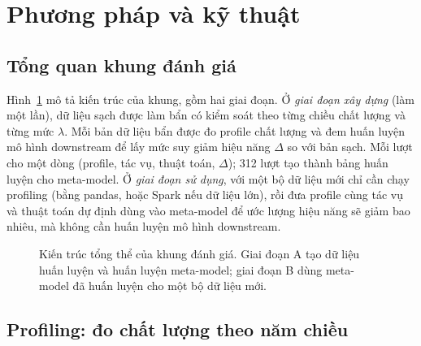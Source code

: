 \section{Phương pháp và kỹ thuật}
\label{sec:phuong-phap}

\subsection{Tổng quan khung đánh giá}

Hình~\ref{fig:pipeline} mô tả kiến trúc của khung, gồm hai giai đoạn. Ở \emph{giai đoạn xây dựng} (làm một lần), dữ liệu sạch được làm bẩn có kiểm soát theo từng chiều chất lượng và từng mức $\lambda$. Mỗi bản dữ liệu bẩn được đo profile chất lượng và đem huấn luyện mô hình downstream để lấy mức suy giảm hiệu năng $\Delta$ so với bản sạch. Mỗi lượt cho một dòng (profile, tác vụ, thuật toán, $\Delta$); 312 lượt tạo thành bảng huấn luyện cho meta-model. Ở \emph{giai đoạn sử dụng}, với một bộ dữ liệu mới chỉ cần chạy profiling (bằng pandas, hoặc Spark nếu dữ liệu lớn), rồi đưa profile cùng tác vụ và thuật toán dự định dùng vào meta-model để ước lượng hiệu năng sẽ giảm bao nhiêu, mà không cần huấn luyện mô hình downstream.

\begin{figure}[htbp]
\centering
\resizebox{\linewidth}{!}{}
\caption{Kiến trúc tổng thể của khung đánh giá. Giai đoạn A tạo dữ liệu huấn luyện và huấn luyện meta-model; giai đoạn B dùng meta-model đã huấn luyện cho một bộ dữ liệu mới.}
\label{fig:pipeline}
\end{figure}

\subsection{Profiling: đo chất lượng theo năm chiều}
\label{sec:profiling}

